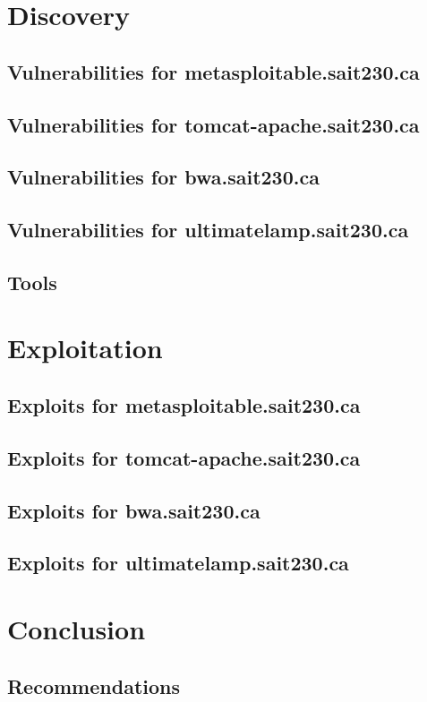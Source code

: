 \documentclass{article}
\begin{document}
\newpage
\section{Discovery}
\subsection{Vulnerabilities for metasploitable.sait230.ca}
\subsection{Vulnerabilities for tomcat-apache.sait230.ca}
\subsection{Vulnerabilities for bwa.sait230.ca}
\subsection{Vulnerabilities for ultimatelamp.sait230.ca}
\subsection{Tools}

\newpage
\section{Exploitation}
\subsection{Exploits for metasploitable.sait230.ca}
\subsection{Exploits for tomcat-apache.sait230.ca}
\subsection{Exploits for bwa.sait230.ca}
\subsection{Exploits for ultimatelamp.sait230.ca}

\newpage
\section{Conclusion}
\subsection{Recommendations}
\end{document}
